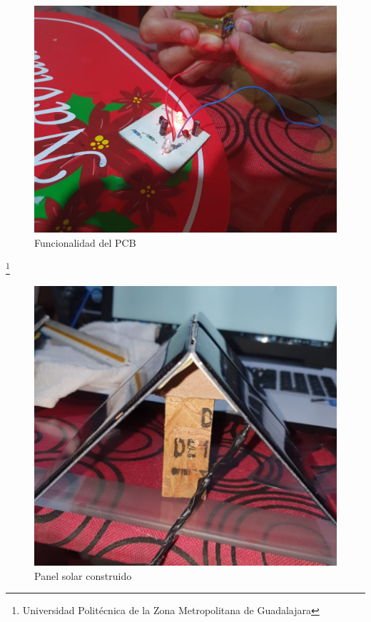 \documentclass[11pt,a4paper]{article}
\begin{document}
\begin{figure}[hbtp]
\caption{Funcionalidad del PCB}
\centering
\includegraphics[scale=0.2]{Pictures/FuncionalidadPCB.jpeg}
\end{figure}

\footnote{Universidad Politécnica de la Zona Metropolitana de Guadalajara}

\newpage
\begin{figure}[hbtp]
\centering
\includegraphics[scale=0.3]{Pictures/Paneles2.jpeg}
\caption{Panel solar construido}
\end{figure}
\end{document}
